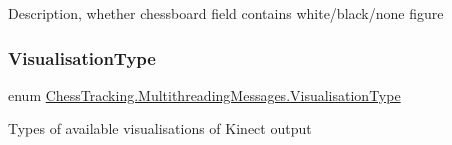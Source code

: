 Description, whether chessboard field contains white/black/none figure 

\mbox{\label{namespace_chess_tracking_1_1_multithreading_messages_ade9732699402e25965677a767015ce90}} 
\subsubsection{\texorpdfstring{VisualisationType}{VisualisationType}}
{\footnotesize\ttfamily enum \mbox{\hyperlink{namespace_chess_tracking_1_1_multithreading_messages_ade9732699402e25965677a767015ce90}{Chess\+Tracking.\+Multithreading\+Messages.\+Visualisation\+Type}}\hspace{0.3cm}{\ttfamily [strong]}}



Types of available visualisations of Kinect output 

